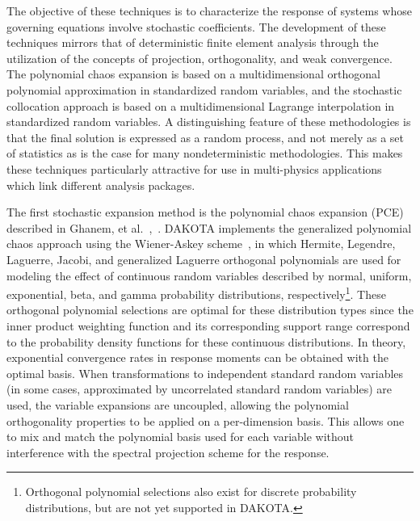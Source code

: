 The objective of these techniques is to characterize the response of
systems whose governing equations involve stochastic coefficients. The
development of these techniques mirrors that of deterministic finite
element analysis through the utilization of the concepts of
projection, orthogonality, and weak convergence. The polynomial chaos
expansion is based on a multidimensional orthogonal polynomial
approximation in standardized random variables, and the stochastic
collocation approach is based on a multidimensional Lagrange
interpolation in standardized random variables.  A distinguishing
feature of these methodologies is that the final solution is expressed as
a random process, and not merely as a set of statistics as is the case
for many nondeterministic methodologies.  This makes these techniques
particularly attractive for use in multi-physics applications which
link different analysis packages.

The first stochastic expansion method is the polynomial chaos
expansion (PCE) described in Ghanem, et
al.~\cite{Gha99},~\cite{Gha91}.  DAKOTA implements the generalized
polynomial chaos approach using the Wiener-Askey
scheme~\cite{XiuKarn02}, in which Hermite, Legendre, Laguerre, Jacobi,
and generalized Laguerre orthogonal polynomials are used for modeling
the effect of continuous random variables described by normal,
uniform, exponential, beta, and gamma probability distributions,
respectively\footnote{Orthogonal polynomial selections also exist for
discrete probability distributions, but are not yet supported in
DAKOTA.}.  These orthogonal polynomial selections are optimal for
these distribution types since the inner product weighting function
and its corresponding support range correspond to the probability
density functions for these continuous distributions.  In theory,
exponential convergence rates in response moments can be obtained with
the optimal basis.  When transformations to independent standard
random variables (in some cases, approximated by uncorrelated standard
random variables) are used, the variable expansions are uncoupled,
allowing the polynomial orthogonality properties to be applied on a
per-dimension basis.  This allows one to mix and match the polynomial
basis used for each variable without interference with the spectral
projection scheme for the response.

